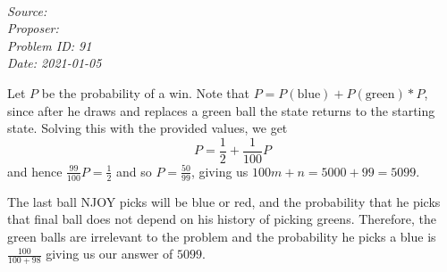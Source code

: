   
\SSbreak\\
\emph{Source: \Cop}\\
\emph{Proposer: \Pnjoy}\\ %
\emph{Problem ID: 91}\\
\emph{Date: 2021-01-05}\\
\SSbreak

\bigskip

\begin{solution}\hfil\medskip
	
	Let \(P\) be the probability of a win. Note that \( P = P(\text{blue}) + P(\text{green}) * P\), since after he draws and replaces a green ball the state returns to the starting state. Solving this with the provided values, we get \[P = \frac 12 + \frac 1{100} P\] and hence \(\frac{99}{100}P = \frac 12\) and so \(P = \frac{50}{99}\), giving us \(100m+n = 5000 + 99 = \boxed{5099}. \)
\end{solution}

\begin{solution}\hfil\medskip
	
The last ball NJOY picks will be blue or red, and the probability that he picks that final ball does not depend on his history of picking greens. Therefore, the green balls are irrelevant to the problem and the probability he picks a blue is \(\frac{100}{100 + 98}\) giving us our answer of $\boxed{5099}$.
\end{solution}\bigskip